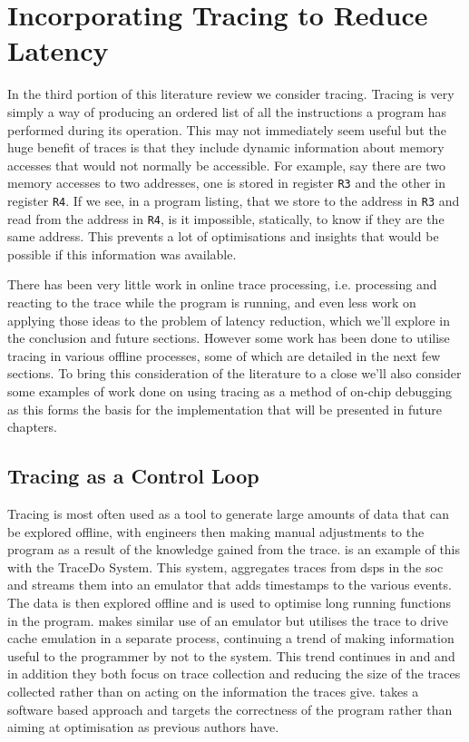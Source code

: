 \section{Incorporating Tracing to Reduce Latency}

\label{sec:tracing}

In the third portion of this literature review we consider tracing. Tracing is very simply a way of producing an ordered list of all the instructions a program has performed during its operation. This may not immediately seem useful but the huge benefit of traces is that they include dynamic information about memory accesses that would not normally be accessible. For example, say there are two memory accesses to two addresses, one is stored in register \texttt{R3} and the other in register \texttt{R4}. If we see, in a program listing, that we store to the address in \texttt{R3} and read from the address in \texttt{R4}, is it impossible, statically, to know if they are the same address. This prevents a lot of optimisations and insights that would be possible if this information was available.

There has been very little work in online trace processing, i.e. processing and reacting to the trace while the program is running, and even less work on applying those ideas to the problem of latency reduction, which we'll explore in the conclusion and future sections. However some work has been done to utilise tracing in various offline processes, some of which are detailed in the next few sections. To bring this consideration of the literature to a close we'll also consider some examples of work done on using tracing as a method of on-chip debugging as this forms the basis for the implementation that will be presented in future chapters.

\subsection{Tracing as a Control Loop}

Tracing is most often used as a tool to generate large amounts of data that can be explored offline, with engineers then making manual adjustments to the program as a result of the knowledge gained from the trace. \citet{huApplicationsOnchipTrace2007} is an example of this with the TraceDo System. This system, aggregates traces from \gls{dsp}s in the \gls{soc} and streams them into an emulator that adds timestamps to the various events. The data is then explored offline and is used to optimise long running functions in the program. \citet{wangRealTimeCache2013} makes similar use of an emulator but utilises the trace to drive cache emulation in a separate process, continuing a trend of making information useful to the programmer by not to the system. This trend continues in \citet{liTracebasedAnalysisMethodology2016} and \citet{mertzPracticalFeasibilitySoftware2019} and in addition they both focus on trace collection and reducing the size of the traces collected rather than on acting on the information the traces give. \citet{chamskiTracebasedRuntimeAnalysis2010} takes a software based approach and targets the correctness of the program rather than aiming at optimisation as previous authors have. 

